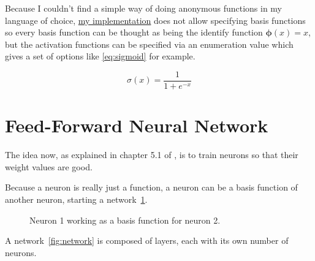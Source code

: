 \documentclass[a4paper,12pt]{article}
\theoremstyle{mytheoremstyle}
\theoremstyle{mytheoremstyle}
\theoremstyle{myproblemstyle}
\begin{document}
    Because I couldn't find a simple way of doing anonymous functions in my
    language of choice, \href{run:../src/utils/neural.zig}{my implementation}
    does not allow specifying basis functions so every
    basis function can be thought as being the identify function $
    \mathbf{\phi}(x) = x $, but the activation functions can be specified via
    an enumeration value which gives a set of options like \eqref{eq:sigmoid}
    for example.

    \begin{equation}
        \sigma\left(x\right) = \frac{1}{1+e^{-x}}
        \label{eq:sigmoid}
    \end{equation}

    \section{Feed-Forward Neural Network}

    The idea now, as explained in chapter 5.1 of \cite{bishop}, is to train
    neurons so that their weight values are good.

    Because a neuron is really just a function, a neuron can be a basis
    function of another neuron, starting a network~\ref{fig:neurons_connecting}.

    \begin{figure}
        \begin{center}
        \end{center}
        \caption{Neuron 1 working as a basis function for neuron 2.}\label{fig:neurons_connecting}
    \end{figure}

    A network~\ref{fig:network} is composed of layers, each with its own number of neurons.
\end{document}

